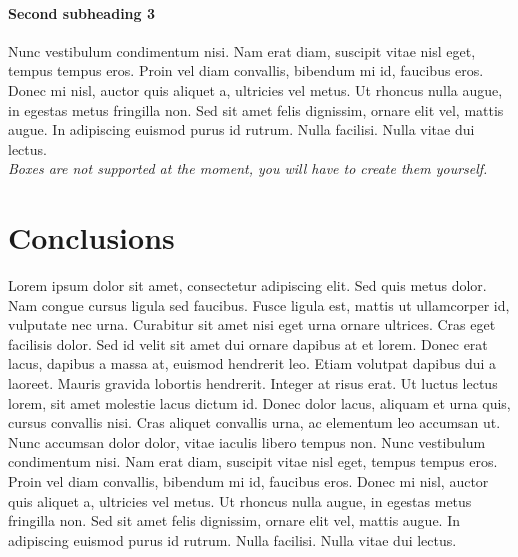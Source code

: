 \documentclass[10pt,a4paper]{article}
\begin{document}
\paragraph{Second subheading 3}
Nunc vestibulum condimentum nisi. Nam erat diam, suscipit vitae nisl eget, tempus tempus eros. Proin vel diam convallis, bibendum mi id, faucibus eros. Donec mi nisl, auctor quis aliquet a, ultricies vel metus. Ut rhoncus nulla augue, in egestas metus fringilla non. Sed sit amet felis dignissim, ornare elit vel, mattis augue. In adipiscing euismod purus id rutrum. Nulla facilisi. Nulla vitae dui lectus.
\\
%
\textit{\color{Red} Boxes are not supported at the moment, you will have to create them yourself.}
\newpage

\section{Conclusions}
\label{sec.conclusion}
%
Lorem ipsum dolor sit amet, consectetur adipiscing elit. Sed quis metus dolor. Nam congue cursus ligula sed faucibus. Fusce ligula est, mattis ut ullamcorper id, vulputate nec urna. Curabitur sit amet nisi eget urna ornare ultrices. Cras eget facilisis dolor. Sed id velit sit amet dui ornare dapibus at et lorem. Donec erat lacus, dapibus a massa at, euismod hendrerit leo.
Etiam volutpat dapibus dui a laoreet. Mauris gravida lobortis hendrerit. Integer at risus erat. Ut luctus lectus lorem, sit amet molestie lacus dictum id. Donec dolor lacus, aliquam et urna quis, cursus convallis nisi. Cras aliquet convallis urna, ac elementum leo accumsan ut. Nunc accumsan dolor dolor, vitae iaculis libero tempus non.
Nunc vestibulum condimentum nisi. Nam erat diam, suscipit vitae nisl eget, tempus tempus eros. Proin vel diam convallis, bibendum mi id, faucibus eros. Donec mi nisl, auctor quis aliquet a, ultricies vel metus. Ut rhoncus nulla augue, in egestas metus fringilla non. Sed sit amet felis dignissim, ornare elit vel, mattis augue. In adipiscing euismod purus id rutrum. Nulla facilisi. Nulla vitae dui lectus.

\newpage

\clearpage
{}
{}
\end{document}
